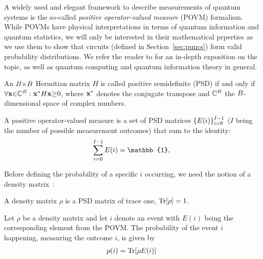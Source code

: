 A widely used and elegant framework to describe measurements of quantum systems is the so-called \textit{positive operator-valued measure} (POVM) formalism. While POVMs have physical interpretations in terms of quantum information and quantum statistics, we will only be interested in their mathematical prperties as we use them to show that  circuits (defined in Section~\ref{sec:puncs}) form valid probability distributions.
We refer the reader to \citep{nielsen2001quantum} for an in-depth exposition on the topic, as well as quantum computing and quantum information theory in general.
\begin{definition}
	An $B {\times} B$ Hermitian matrix $H$ is called positive semidefinite (PSD) if and only if $\forall \mathbf{x} {\in}  \mathbb {C} ^{B}: \mathbf{x}^{*} H \mathbf{x} {\geq} 0$, where $\mathbf{x}^{*}$ denotes the conjugate transpose and $\mathbb {C}^{B}$ the $B$-dimensional space of complex numbers.
\end{definition}
\begin{definition}
	\label{def:povm}
	A positive operator-valued measure
	is a set of PSD  matrices $\{E(i)\}_{i=0}^{I-1}$ ($I$ being the number of possible measurement outcomes) that sum to the identity:
	\begin{align}
		\sum_{i=0}^{\numevents-1} E(i) = \mathbb{1},
		\label{eq:povm_normalized}
	\end{align}
\end{definition}
Before defining the probability of a specific $i$ occurring, we need the notion of a density matrix~\citep{neumann1927wahrscheinlich}:
\begin{definition}
	\label{def:density_matrix}
	A density matrix $\rho$ is a PSD matrix of trace one, \ie $\Tr [\rho]=1$.
\end{definition}
\begin{definition}
	\label{def:eventprob}
	Let $\rho$ be a density matrix and let $i$ denote an event with $E(i)$ being the corresponding element from the POVM. The probability of the event $i$ happening, \ie measuring the outcome $i$, is given by
	\begin{align}
		p(i) = \Tr [ \rho E(i)]
		\label{eq:povm_prob}
	\end{align}
\end{definition}





